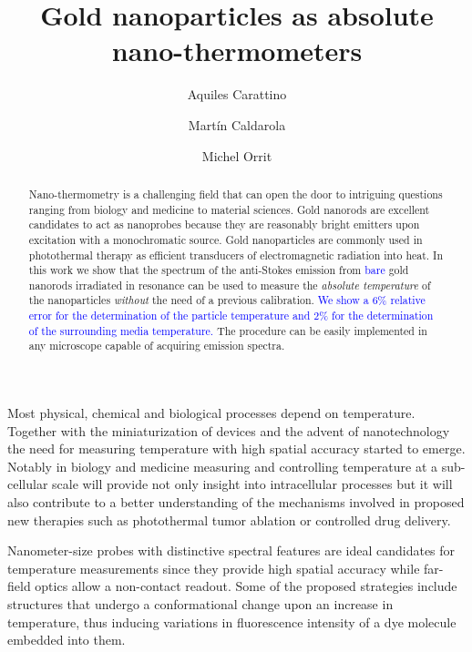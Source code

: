 \documentclass[journal=nalefd,manuscript=letter]{achemso}
\author{Aquiles Carattino}
\affiliation[Leiden]
{Huygens-Kamerlingh Onnes Lab, 2300RA Leiden, The Netherlands}
\author{Mart\'in Caldarola}
\affiliation[Leiden]
{Huygens-Kamerlingh Onnes Lab, 2300RA Leiden, The Netherlands}
\author{Michel Orrit}
\affiliation[Leiden]
{Huygens-Kamerlingh Onnes Lab, 2300RA Leiden, The Netherlands}
\title{Gold nanoparticles as absolute nano-thermometers}
\newcommand{\HI}[1]{\textcolor{blue}{#1}} %
\begin{document}
\maketitle

\begin{abstract}
Nano-thermometry is a challenging field that can open the door
to intriguing questions ranging from biology and medicine to material sciences.
Gold nanorods are excellent candidates to act as nanoprobes because they are
reasonably bright emitters upon excitation with a monochromatic source.
Gold nanoparticles are commonly used in photothermal therapy as efficient
transducers of electromagnetic radiation into heat. In this work we show that
the spectrum of the anti-Stokes emission from \HI{bare} gold nanorods irradiated in
resonance can be used to measure the \textit{absolute temperature} of the nanoparticles 
\textit{without} the need of a previous calibration. \HI{We show a $6$\%  relative error for 
the determination of the particle temperature and  $2$\% for the determination of the surrounding media temperature.}
The procedure can be easily implemented in any microscope capable of acquiring emission spectra. 

\end{abstract}


Most physical, chemical and biological processes depend on
temperature. Together with the miniaturization of devices and the advent of
nanotechnology the need for measuring temperature with high spatial accuracy
started to emerge. Notably in biology\cite{Yang2011a,Hrelescu2010} and
medicine\cite{Li2013c} measuring and controlling temperature at a sub-cellular scale
will provide not only insight into intracellular processes but it will
also contribute to a better understanding of the mechanisms involved in proposed
new therapies such as photothermal tumor ablation\cite{Gobin2007} or controlled
drug delivery\cite{Huang2006,Huo2014}.

Nanometer-size probes with distinctive spectral features are ideal candidates
for temperature measurements since they provide high spatial accuracy while
far-field optics allow a non-contact readout. Some of the proposed strategies
include structures that undergo a conformational change upon an increase in
temperature\cite{Ebrahimi2014}, thus inducing variations in fluorescence
intensity of a dye molecule embedded into them.
\end{document}
